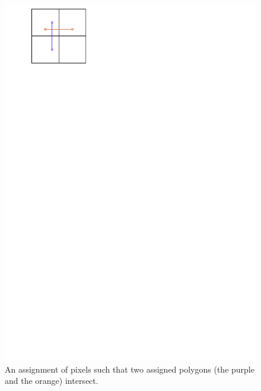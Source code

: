 \documentclass[a4paper, 11pt]{article}
\begin{document}
\begin{figure}[tb]
\centering
\includegraphics{Figures/intersection.pdf}
\caption{An assignment of pixels such that two assigned polygons (the purple and the orange) intersect.}
\label{fig:intersection}
\end{figure}
\end{document}
